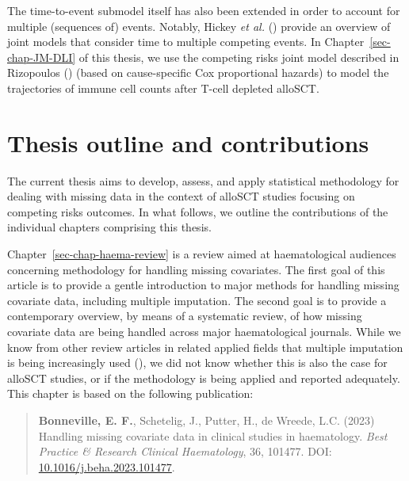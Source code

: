 \documentclass[
  letterpaper,
  DIV=11,
  numbers=noendperiod]{scrreprt}
\begin{document}
The time-to-event submodel itself has also been extended in order to
account for multiple (sequences of) events. Notably, Hickey \emph{et
al.} () provide an
overview of joint models that consider time to multiple competing
events. In Chapter~\ref{sec-chap-JM-DLI} of this thesis, we use the
competing risks joint model described in Rizopoulos
() (based on
cause-specific Cox proportional hazards) to model the trajectories of
immune cell counts after T-cell depleted alloSCT.

\section{Thesis outline and contributions}\label{sec-intro-outline}

The current thesis aims to develop, assess, and apply statistical
methodology for dealing with missing data in the context of alloSCT
studies focusing on competing risks outcomes. In what follows, we
outline the contributions of the individual chapters comprising this
thesis.

Chapter~\ref{sec-chap-haema-review} is a review aimed at haematological
audiences concerning methodology for handling missing covariates. The
first goal of this article is to provide a gentle introduction to major
methods for handling missing covariate data, including multiple
imputation. The second goal is to provide a contemporary overview, by
means of a systematic review, of how missing covariate data are being
handled across major haematological journals. While we know from other
review articles in related applied fields that multiple imputation is
being increasingly used
(), we did not know whether this is also the case for
alloSCT studies, or if the methodology is being applied and reported
adequately. This chapter is based on the following publication:

\begin{quote}
\textbf{Bonneville, E. F.}, Schetelig, J., Putter, H., de Wreede, L.C.
(2023) Handling missing covariate data in clinical studies in
haematology. \emph{Best Practice \& Research Clinical Haematology}, 36,
101477. DOI:
\href{https://doi.org/10.1016/j.beha.2023.101477}{10.1016/j.beha.2023.101477}.
\end{quote}
\end{document}
